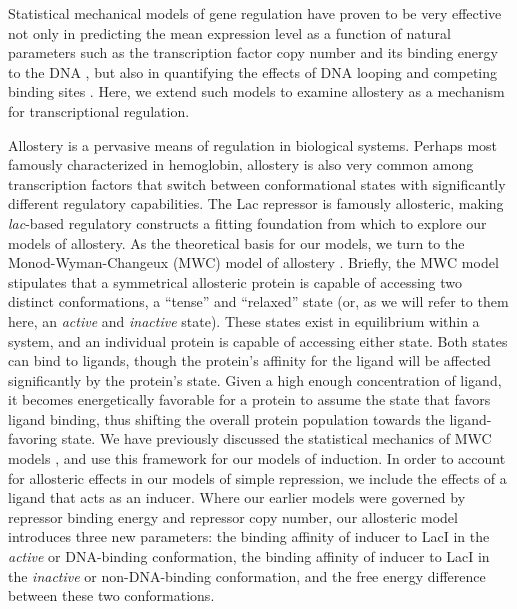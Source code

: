 Statistical mechanical
models of gene regulation have proven to be very effective not only in
predicting the mean expression level as a function of natural parameters such as
the transcription factor copy number and its binding energy to the DNA
\cite{Garcia2011}, but also in quantifying the effects of DNA looping
\cite{Boedicker2013a} and competing binding sites \cite{Brewster2014}. Here, we
extend such models to examine allostery as a mechanism for transcriptional
regulation. 

Allostery is a pervasive means of regulation in biological systems. Perhaps most
famously characterized in hemoglobin, allostery is also very common among
transcription factors that switch between conformational states with
significantly different regulatory capabilities. The Lac repressor is famously
allosteric, making \textit{lac}-based regulatory constructs a fitting foundation
from which to explore our models of allostery. As the theoretical basis for our
models, we turn to the Monod-Wyman-Changeux (MWC) model of allostery
\cite{MONOD1965}. Briefly, the MWC model stipulates that a symmetrical
allosteric protein is capable of accessing two distinct conformations, a
``tense'' and ``relaxed'' state (or, as we will refer to them here, an
\textit{active} and \textit{inactive} state). These states exist in equilibrium
within a system, and an individual protein is capable of accessing either state.
Both states can bind to ligands, though the protein's affinity for the ligand
will be affected significantly by the protein's state.  Given a high
enough concentration of ligand, it becomes energetically favorable for a protein
to assume the state that favors ligand binding, thus shifting the overall
protein population towards the ligand-favoring state. We have previously
discussed the statistical mechanics of MWC models \cite{Marzen2013}, and use
this framework for our models of induction. In order to account for allosteric
effects in our models of simple repression, we include the effects of a ligand
that acts as an inducer. Where our earlier models were governed by repressor
binding energy and repressor copy number, our allosteric model introduces three
new parameters: the binding affinity of inducer to LacI in the \textit{active}
or DNA-binding conformation, the binding affinity of inducer to LacI in the
\textit{inactive} or non-DNA-binding conformation, and the free energy
difference between these two conformations.

